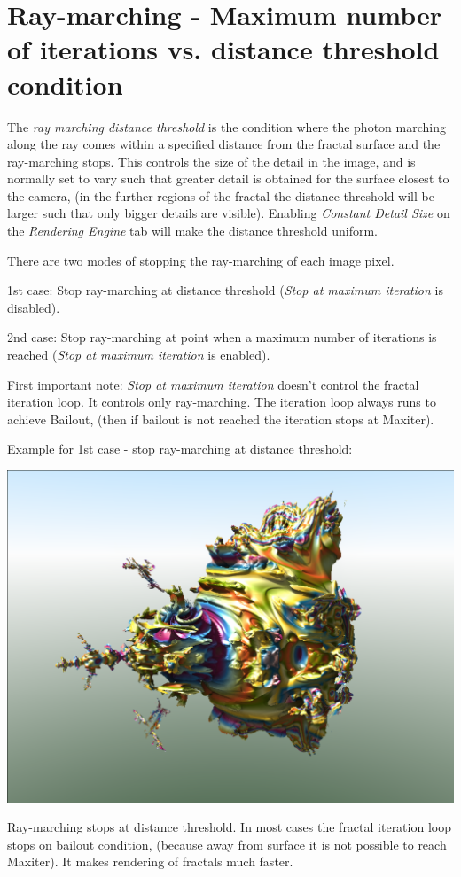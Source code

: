 \section{Ray-marching - Maximum number of iterations vs. distance threshold
	condition}\label{ray-marching---maximum-number-of-iterations-vs.-distance-threshold-condition}

The \emph{ray marching distance threshold} is the condition where the photon
marching along the ray comes within a specified distance from the fractal
surface and the ray-marching stops. This controls the size of the detail in the
image, and is normally set to vary such that greater detail is obtained for the
surface closest to the camera, (in the further regions of the fractal the
distance threshold will be larger such that only bigger details are visible).
Enabling \emph{Constant Detail Size} on the \emph{Rendering Engine} tab will
make the distance threshold uniform.

There are two modes of stopping the ray-marching of each image pixel.

1st case: Stop ray-marching at distance threshold (\emph{Stop at maximum
	iteration} is disabled).

2nd case: Stop ray-marching at point when a maximum number of iterations is
reached (\emph{Stop at maximum iteration} is enabled).

First important note: \emph{Stop at maximum iteration} doesn't control the
fractal iteration loop. It controls only ray-marching. The iteration loop always
runs to achieve Bailout, (then if bailout is not reached the iteration stops at
Maxiter).

\begin{samepage} Example for 1st case - stop ray-marching at distance threshold:
	
	\includegraphics[width=0.5\linewidth]{img/manual/media/stop_raymarching_at_disttrhersh}
	
	Ray-marching stops at distance threshold. In most cases the fractal iteration
	loop stops on bailout condition, (because away from surface it is not possible
	to reach Maxiter). It makes rendering of fractals much faster. \end{samepage}

